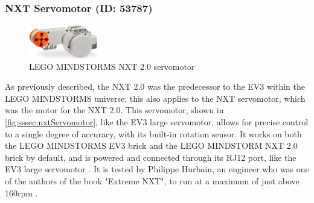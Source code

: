 \subsubsection{NXT Servomotor (ID: 53787)}
\begin{figure}[H]
  \centering
  \includegraphics[width=3cm]{images/techAnalysis/LegoNXT2Servomotor.jpg}
  \caption{LEGO MINDSTORMS NXT 2.0 servomotor \cite{BrickOWl-figure-NXT2-Servo}}\label{fig:sssec:nxtServomotor}
\end{figure}
As previously described, the NXT 2.0 was the predecessor to the EV3 within the LEGO MINDSTORMS universe, this also applies to the NXT servomotor, which was the motor for the NXT 2.0.
This servomotor, shown in \autoref{fig:sssec:nxtServomotor}, like the EV3 large servomotor, allows for precise control to a single degree of accuracy, with its built-in rotation sensor.
It works on both the LEGO MINDSTORMS EV3 brick and the LEGO MINDSTORM NXT 2.0 brick by default, and is powered and connected through its RJ12 port, like the EV3 large servomotor \cite{lego_lego_EV3NXTCompatibility}.
It is tested by Philippe Hurbain, an engineer who was one of the authors of the book "Extreme NXT", to run at a maximum of just above 160rpm \cite{gasperi_extreme_2009} \cite{hurbain_nxt_nodate}.
\cite{lego_mindstorms_2009}

